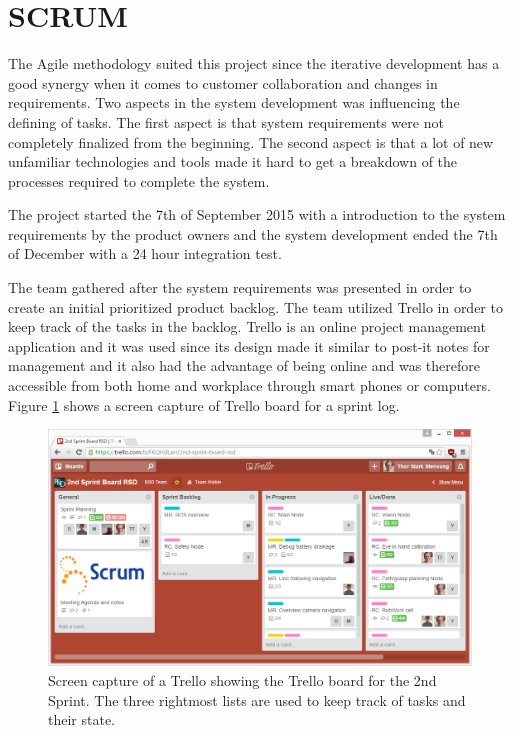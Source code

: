 \section{SCRUM \label{sec:scrum}}


The Agile methodology suited this project since the iterative development has a good synergy when it comes to customer collaboration and changes in requirements. Two aspects in the system development was influencing the defining of tasks. The first aspect is that system requirements were not completely finalized from the beginning. The second aspect is that a lot of new unfamiliar technologies and tools made it hard to get a breakdown of the processes required to complete the system.

The project started the 7th of September 2015 with a introduction to the system requirements by the product owners and the system development ended the 7th of December with a 24 hour integration test.

The team gathered after the system requirements was presented in order to create an initial prioritized product backlog. The team utilized Trello \citep{trello} in order to keep track of the tasks in the backlog. Trello is an online project management application and it was used since its design made it similar to post-it notes for management and it also had the advantage of being online and was therefore accessible from both home and workplace through smart phones or computers. Figure \ref{fig:trello_cap} shows a screen capture of Trello board for a sprint log.
\begin{figure}[H]
	\centering
	\includegraphics[width=\textwidth]{figs/trello_example.png}
	\caption{Screen capture of a Trello showing the Trello board for the 2nd Sprint. The three rightmost lists are used to keep track of tasks and their state.}
	\label{fig:trello_cap}
\end{figure}

